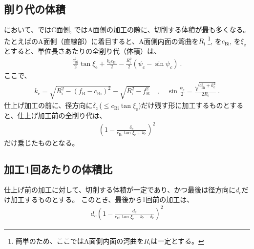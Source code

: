 \subsection{削り代の体積}
\EndFaceChamferMilling において、\EndFaceOutChamferMilling ではC面側, \EndFaceInChamferMilling ではA面側の加工の際に、切削する体積が最も多くなる。
たとえば\BottomEndFaceInCChamfer のA面側（直線部）に着目すると、A面側内面の湾曲を$R_\mathrm i$%
\footnote{簡単のため、ここではA面側内面の湾曲を$R_\mathrm i$は一定とする。},
\EndFaceInCChamferLength を$c_\mathrm{Bi}$, \EndFaceInCChamferAngle を$\xi_\mathrm e$とすると、単位長さあたりの全削り代（体積）は、
\begin{align*}
  \frac{c_\mathrm{Bi}^2}2\tan\xi_\mathrm e
  +\frac{k_cc_\mathrm{Bi}}2
  -\frac{R_\mathrm i^2}2(\psi_c-\sin\psi_c)\ .
\end{align*}
ここで、
\begin{align*}
  k_c = \sqrt{R_\mathrm i^2-(f_\mathrm B-c_\mathrm{Bi})^2}
        -\sqrt{R_\mathrm i^2-f_\mathrm B^2}\quad, \quad
  \sin\frac{\psi_c}2 = \frac{\sqrt{c_\mathrm{Bi}^2+k_c^2}}{2R_\mathrm i}\ .
\end{align*}
仕上げ加工の前に、径方向に$\delta_\mathrm c$\,($\leq c_\mathrm{Bi}\tan\xi_\mathrm e$)だけ残す形に加工するものとすると、仕上げ加工前の全削り代は、
\begin{align*}
  \left(1-\frac{\delta_\mathrm e}{c_\mathrm{Bi}\tan\xi_\mathrm e+k_c}\right)^2
\end{align*}
だけ乗じたものとなる。


\subsection{加工1回あたりの体積比\TBW}
仕上げ前の加工に対して、切削する体積が一定であり、かつ最後は径方向に$d_c$だけ加工するものとする。
このとき、最後から1回前の加工は、
\begin{align*}
  d_c\left(1-\frac{d_c}{c_\mathrm{Bi}\tan\xi_\mathrm e+k_c-\delta_\mathrm e}\right)^2
\end{align*}






